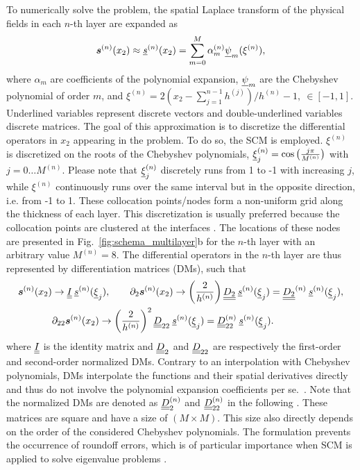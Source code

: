 To numerically solve the problem, the spatial Laplace transform of the physical fields in each $n$-th layer are expanded as
    \begin{equation}
        \boldsymbol s^{(n)}(x_2) \approx \underline{s}^{(n)}(x_2) = \sum_{m = 0}^M \alpha_m^{(n)} \underline{\psi}_m (\xi^{(n)}),
        \label{eq:field_to_polynomial}
    \end{equation}
    where $\alpha_m$ are coefficients of the polynomial expansion, $\underline{\psi}_m$ are the Chebyshev polynomial of order $m$, and $\xi^{(n)} = 2(x_2-\sum_{j=1}^{n-1}h^{(j)})/h^{(n)} - 1,~\in[-1,1]$. Underlined variables represent discrete vectors and double-underlined variables discrete matrices. The goal of this approximation is to discretize the differential operators in $x_2$ appearing in the problem. To do so, the SCM is employed. $\xi^{(n)}$ is discretized on the roots of the Chebyshev polynomials, $\underline{\xi}_j^{(n)} = \cos\left(\frac{j\pi}{M^{(n)}}\right)$ with $j=0\ldots M^{(n)}$. Please note that $\underline{\xi}_j^{(n)}$ discretely runs from 1 to -1 with increasing $j$, while $\xi^{(n)}$ continuously runs over the same interval but in the opposite direction, i.e. from -1 to 1. These collocation points/nodes form a non-uniform grid along the thickness of each layer. This discretization is usually preferred because the collocation points are clustered at the interfaces \cite{trefethen2000}. The locations of these nodes are presented in Fig.~\ref{fig:schema_multilayer}b for the $n$-th layer with an arbitrary value $M^{(n)}=8$. The differential operators in the $n$-th layer are thus represented by differentiation matrices (DMs), such that
    \begin{equation}
        \begin{aligned}
            \boldsymbol s^{(n)} (x_2) & \rightarrow \underline{\underline{I}} \:\underline{s}^{(n)} (\underline{\xi}_j), \quad \quad
            \partial_2 \boldsymbol s^{(n)} (x_2) \rightarrow \left( \frac{ 2}{ h^{(n)}} \right) \underline{\underline{ D_2}} \: \underline{s}^{(n)}(\underline{\xi}_j)= \underline{\underline{ D_2}}^{(n)} \: \underline{s}^{(n)}(\underline{\xi}_j), \\
            & \partial_{22} \boldsymbol s^{(n)} (x_2) \rightarrow \left( \frac{ 2}{ h^{(n)}} \right)^2 \underline{\underline{D}}_{22} \:\underline{s}^{(n)}(\underline{\xi}_j)= \underline{\underline{D}}_{22}^{(n)} \:\underline{s}^{(n)}(\underline{\xi}_j). \\
        \end{aligned}
        \label{eq:diff_matrices}
    \end{equation}
where $\underline{\underline{I}}$ is the identity matrix and $\underline{\underline{D}}_2$ and $\underline{\underline{D}}_{22}$ are respectively the first-order and second-order normalized DMs. Contrary to an interpolation with Chebyshev polynomials, DMs interpolate the functions and their spatial derivatives directly and thus do not involve the polynomial expansion coefficients per se.~\cite{weideman2000}. Note that the normalized DMs are denoted as $\underline{\underline{D}}_{2}^{(n)}$ and $\underline{\underline{D}}_{22}^{(n)}$ in the following . These matrices are square and have a size of $(M \times M)$. This size also directly depends on the order of the considered Chebyshev polynomials. The formulation prevents the occurrence of roundoff errors, which is of particular importance when SCM is applied to solve eigenvalue problems \cite{baltensperger2003}.
    
